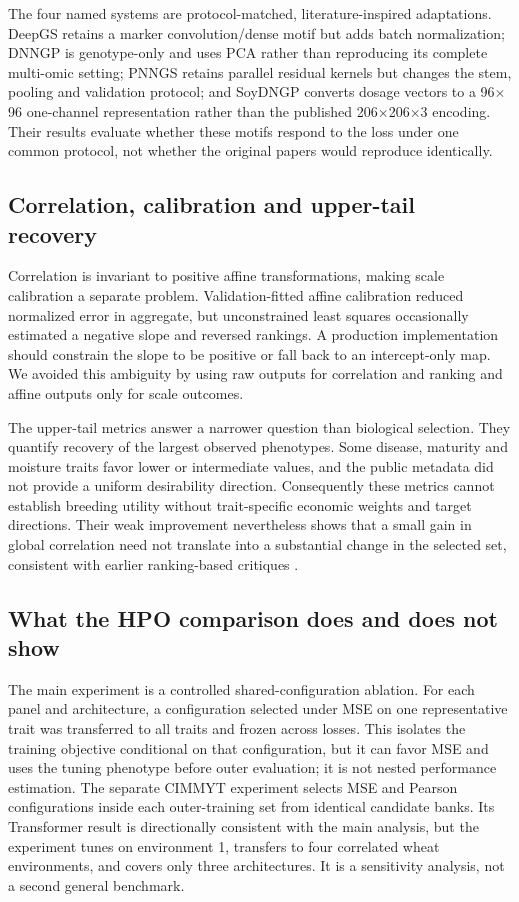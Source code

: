 The four named systems are protocol-matched, literature-inspired adaptations.
DeepGS retains a marker convolution/dense motif but adds batch normalization;
DNNGP is genotype-only and uses PCA rather than reproducing its complete
multi-omic setting; PNNGS retains parallel residual kernels but changes the
stem, pooling and validation protocol; and SoyDNGP converts dosage vectors to a
96$\times$96 one-channel representation rather than the published
206$\times$206$\times$3 encoding. Their results evaluate whether these motifs
respond to the loss under one common protocol, not whether the original papers
would reproduce identically.

\subsection{Correlation, calibration and upper-tail recovery}
Correlation is invariant to positive affine transformations, making scale
calibration a separate problem. Validation-fitted affine calibration reduced
normalized error in aggregate, but unconstrained least squares occasionally
estimated a negative slope and reversed rankings. A production implementation
should constrain the slope to be positive or fall back to an intercept-only
map. We avoided this ambiguity by using raw outputs for correlation and ranking
and affine outputs only for scale outcomes.

The upper-tail metrics answer a narrower question than biological selection.
They quantify recovery of the largest observed phenotypes. Some disease,
maturity and moisture traits favor lower or intermediate values, and the public
metadata did not provide a uniform desirability direction. Consequently these
metrics cannot establish breeding utility without trait-specific economic
weights and target directions. Their weak improvement nevertheless shows that a
small gain in global correlation need not translate into a substantial change
in the selected set, consistent with earlier ranking-based critiques
\citep{ornella2014,blondel2015}.

\subsection{What the HPO comparison does and does not show}
The main experiment is a controlled shared-configuration ablation. For each
panel and architecture, a configuration selected under MSE on one representative
trait was transferred to all traits and frozen across losses. This isolates the
training objective conditional on that configuration, but it can favor MSE and
uses the tuning phenotype before outer evaluation; it is not nested
performance estimation. The separate CIMMYT experiment selects MSE and Pearson
configurations inside each outer-training set from identical candidate banks.
Its Transformer result is directionally consistent with the main analysis, but
the experiment tunes on environment 1, transfers to four correlated wheat
environments, and covers only three architectures. It is a sensitivity analysis,
not a second general benchmark.

